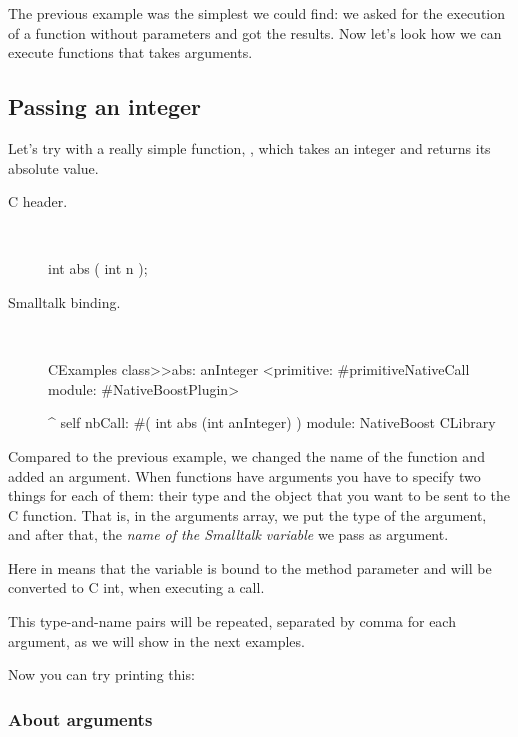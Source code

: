 \documentclass[a4paper,10pt,twoside]{book}
\begin{document}
The previous example was the simplest we could find: we asked for the execution of a function without parameters and got the results. Now let's look how we can execute functions that takes arguments. 

\subsection{Passing an integer}

Let's try with a really simple function, , which takes
an integer and returns its absolute value.

\begin{description}
\item [C header.] \ 

\begin{code}{}
int abs ( int n );
\end{code}

\item [Smalltalk binding.] \ 

\begin{code}{}
CExamples class>>abs: anInteger
	<primitive: #primitiveNativeCall module: #NativeBoostPlugin>
	
	^ self nbCall: #( int abs (int anInteger) ) module: NativeBoost CLibrary
\end{code}

\end{description}


Compared to the previous example, we changed the name of the function and added an argument. 
When functions have arguments you have to specify two things for each of them:
their type and the object that you want to be sent to the C function. That is, in the arguments array, we put the type
of the argument, and after that, the \emph{name of the Smalltalk variable} we pass as argument. 

Here  in  means that the variable is bound to the  method parameter and will be converted to C int,
when executing a call. 

This type-and-name pairs will be repeated, separated by comma for each argument,
as we will show in the next examples. 


Now you can try printing this:


\subsubsection{About arguments}
\end{document}
